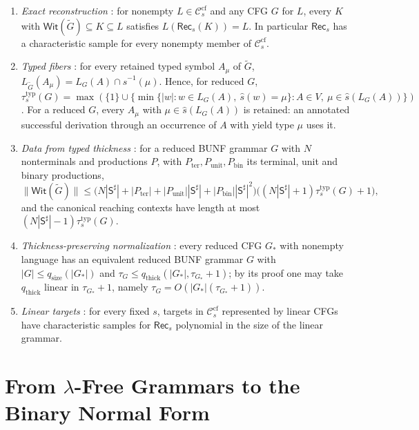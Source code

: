 \documentclass[11pt]{article}
\numberwithin{equation}{section}
\theoremstyle{plain}
\theoremstyle{definition}
\theoremstyle{remark}
\theoremstyle{plain}
\newcommand{\cf}{\mathrm{cf}}
\newcommand{\Ccf}[1]{\mathcal C_{#1}^{\cf}}
\newcommand{\Rec}{\mathsf{Rec}}
\newcommand{\WitnessSet}{\mathsf{Wit}}
\begin{document}
\begin{enumerate}[label=(Q\arabic*),leftmargin=*]
\item\label{q:exact} \emph{Exact reconstruction} \cite[Theorem~5.3]{kuriyamaCFG}:
for nonempty $L\in\Ccf{s}$ and any CFG $G$ for $L$, every $K$ with
$\WitnessSet(\widetilde G)\subseteq K\subseteq L$ satisfies
$L(\Rec_s(K))=L$.  In particular $\Rec_s$ has a characteristic sample for
every nonempty member of $\Ccf{s}$.
\item\label{q:typed-core} \emph{Typed fibers} \cite[Proposition~5.1]{kuriyamaCFG}:
for every retained typed symbol $A_\mu$ of $\widetilde G$,
$L_{\widetilde G}(A_\mu)=L_G(A)\cap\widehat s^{-1}(\mu)$.  Hence, for reduced $G$,
$\tau^{\mathrm{typ}}_s(G)=\max(\{1\}\cup\{\min\{|w|:w\in L_G(A),\
\widehat s(w)=\mu\}:A\in V,\ \mu\in\widehat s(L_G(A))\})$.
For a reduced $G$, every $A_\mu$ with $\mu\in\widehat s(L_G(A))$ is retained: an
annotated successful derivation through an occurrence of $A$ with yield type
$\mu$ uses it.
\item\label{q:data} \emph{Data from typed thickness}
\cite[Lemma~6.2, Corollary~6.3]{kuriyamaCFG}: for a reduced BUNF grammar $G$
with $N$ nonterminals and productions $P$,
with $P_{\mathrm{ter}},P_{\mathrm{unit}},P_{\mathrm{bin}}$ its terminal, unit and binary
productions,
\[
 \|\WitnessSet(\widetilde G)\|\le
 \bigl(N|\mathsf S^\sharp|+|P_{\mathrm{ter}}|+|P_{\mathrm{unit}}||\mathsf S^\sharp|
 +|P_{\mathrm{bin}}||\mathsf S^\sharp|^2\bigr)
 \bigl((N|\mathsf S^\sharp|+1)\tau^{\mathrm{typ}}_s(G)+1\bigr),
\]
and the canonical reaching contexts have length at most
$(N|\mathsf S^\sharp|-1)\tau^{\mathrm{typ}}_s(G)$.
\item\label{q:bunf} \emph{Thickness-preserving normalization}
\cite[Proposition~7.3]{kuriyamaCFG}: every reduced CFG $G_*$ with nonempty
language has an equivalent reduced BUNF grammar $G$ with
$|G|\le q_{\mathrm{size}}(|G_*|)$ and
$\tau_G\le q_{\mathrm{thick}}(|G_*|,\tau_{G_*}+1)$; by its proof
\cite[Appendix~A.2]{kuriyamaCFG} one may take $q_{\mathrm{thick}}$ linear in
$\tau_{G_*}+1$, namely $\tau_G=O(|G_*|(\tau_{G_*}+1))$.
\item\label{q:linear} \emph{Linear targets} \cite[Theorem~8.3]{kuriyamaCFG}: for
every fixed $s$, targets in $\Ccf{s}$ represented by linear CFGs have
characteristic samples for $\Rec_s$ polynomial in the size of the linear
grammar.
\end{enumerate}

\section{From \texorpdfstring{$\lambda$}{Lambda}-Free Grammars to the Binary Normal Form}
\label{sec:bridge}
\end{document}
